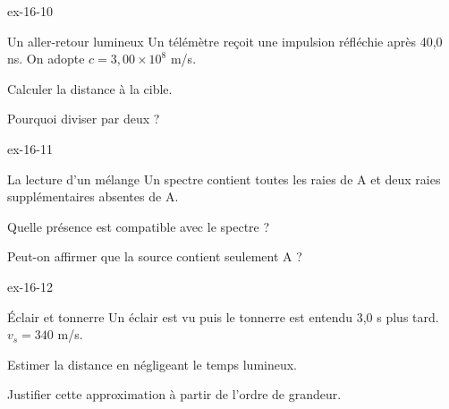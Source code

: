 \begin{blocLivre}{ex-16-10}\begin{exercice}[3]{Un aller-retour lumineux}
Un télémètre reçoit une impulsion réfléchie après 40,0 ns. On adopte $c=3,00\times10^8$ m/s.
\begin{questions}
\item Calculer la distance à la cible.
\item Pourquoi diviser par deux ?
\end{questions}
\end{exercice}\end{blocLivre}
\begin{blocLivre}{ex-16-11}\begin{exercice}[3]{La lecture d’un mélange}
Un spectre contient toutes les raies de A et deux raies supplémentaires absentes de A.
\begin{questions}
\item Quelle présence est compatible avec le spectre ?
\item Peut-on affirmer que la source contient seulement A ?
\end{questions}
\end{exercice}\end{blocLivre}
\begin{blocLivre}{ex-16-12}\begin{exercice}[3]{Éclair et tonnerre}
Un éclair est vu puis le tonnerre est entendu 3,0 s plus tard. $v_s=340$ m/s.
\begin{questions}
\item Estimer la distance en négligeant le temps lumineux.
\item Justifier cette approximation à partir de l’ordre de grandeur.
\end{questions}
\end{exercice}\end{blocLivre}

